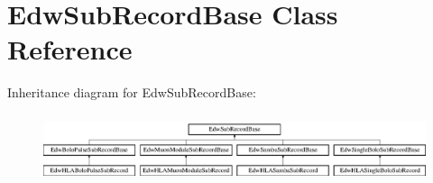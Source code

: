 \hypertarget{class_edw_sub_record_base}{
\section{EdwSubRecordBase Class Reference}
\label{class_edw_sub_record_base}
}
Inheritance diagram for EdwSubRecordBase:\begin{figure}[H]
\begin{center}
\leavevmode
\includegraphics[height=2.00957cm]{class_edw_sub_record_base}
\end{center}
\end{figure}
